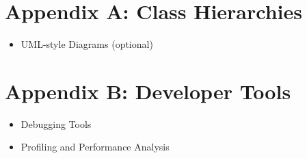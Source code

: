 \documentclass[12pt]{article}
\begin{document}
	\appendix
	
	\section{Appendix A: Class Hierarchies}
	\begin{itemize}
		\item UML-style Diagrams (optional)
	\end{itemize}
	
	\section{Appendix B: Developer Tools}
	\begin{itemize}
		\item Debugging Tools
		\item Profiling and Performance Analysis
	\end{itemize}
	
\end{document}
